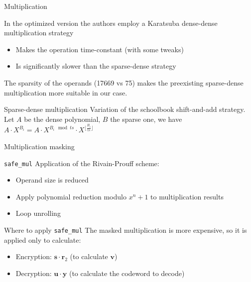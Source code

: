 \begin{frame}{Multiplication}
    \begin{block}{}
        In the optimized version the authors employ a Karatsuba dense-dense multiplication strategy
        \begin{itemize}
            \item Makes the operation time-constant (with some tweaks)
            \item Is significantly slower than the sparse-dense strategy
        \end{itemize}
        The sparsity of the operands (17669 vs 75) makes the preexisting sparse-dense multiplication more suitable in our case.
    \end{block}
    \begin{block}{Sparse-dense multiplication}
        Variation of the schoolbook shift-and-add strategy.\\
        Let $A$ be the dense polynomial, $B$ the sparse one, we have $A\cdot X^{B_i} = A\cdot X^{B_i \mod ts} \cdot X^{\lfloor \frac{B_i}{ts}\rfloor}$
    \end{block}
\end{frame}

\begin{frame}{Multiplication masking}
    \begin{block}{\texttt{safe\_mul}}
        Application of the Rivain-Prouff scheme:
        \begin{itemize}
            \item Operand size is reduced
            \item Apply polynomial reduction modulo $x^n+1$ to multiplication results
            \item Loop unrolling
        \end{itemize}
    \end{block}
    \begin{block}{Where to apply \texttt{safe\_mul}}
        The masked multiplication is more expensive, so it is applied only to calculate:
        \begin{itemize}
            \item Encryption: $\mathbf{s}\cdot \mathbf{r}_2$ (to calculate $\mathbf{v}$)
            \item Decryption: $\mathbf{u \cdot y}$ (to calculate the codeword to decode)
        \end{itemize}
    \end{block}
\end{frame}

